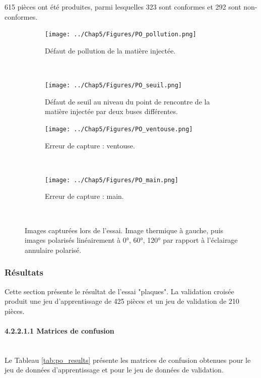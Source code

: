 615 pièces ont été produites, parmi lesquelles 323 sont conformes et 292 sont non-conformes.

\begin{figure}[bth!]
	\centering
	\begin{subfigure}[c]{\textwidth}
		\texttt{[image: ../Chap5/Figures/PO\_pollution.png]}
		\caption{Défaut de pollution de la matière injectée.}
		\vspace*{1mm}
	\end{subfigure}
	\\
	\begin{subfigure}[c]{\textwidth}
		\texttt{[image: ../Chap5/Figures/PO\_seuil.png]}
		\caption{Défaut de seuil au niveau du point de rencontre de la matière injectée par deux buses différentes.}
		\vspace*{1mm}
	\end{subfigure}
	\begin{subfigure}[c]{\textwidth}
		\texttt{[image: ../Chap5/Figures/PO\_ventouse.png]}
		\caption{Erreur de capture : ventouse.}
		\vspace*{1mm}
	\end{subfigure}
	\\
	\begin{subfigure}[c]{\textwidth}
		\texttt{[image: ../Chap5/Figures/PO\_main.png]}
		\caption{Erreur de capture : main.}
		\vspace*{1mm}
	\end{subfigure}
	\\
	\caption{Images capturées lors de l'essai. Image thermique à gauche, puis images polarisés linéairement à 0°, 60°, 120° par rapport à l'éclairage annulaire polarisé.}
	\label{fig:po_trial}
\end{figure}


\subsubsection{Résultats}
Cette section présente le résultat de l'essai "plaques".
La validation croisée produit une jeu d'apprentissage de 425 pièces et un jeu de validation de 210 pièces.

\paragraph{4.2.2.1.1 Matrices de confusion} \mbox{} \\
Le Tableau \ref{tab:po_results} présente les matrices de confusion obtenues pour le jeu de données d'apprentissage et pour le jeu de données de validation.

